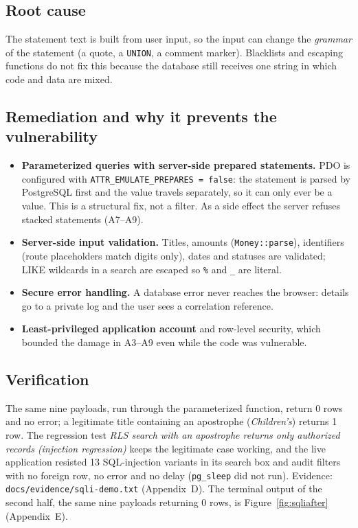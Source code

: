 \documentclass[10pt,a4paper]{article}
\newcommand{\code}[1]{\nolinkurl{#1}}
\begin{document}
\subsection{Root cause}
The statement text is built from user input, so the input can change the \emph{grammar} of the statement (a quote, a \code{UNION}, a comment marker). Blacklists and escaping functions do not fix this because the database still receives one string in which code and data are mixed.

\subsection{Remediation and why it prevents the vulnerability}
\begin{itemize}
\item \textbf{Parameterized queries with server-side prepared statements.} PDO is configured with \code{ATTR\_EMULATE\_PREPARES = false}: the statement is parsed by PostgreSQL first and the value travels separately, so it can only ever be a value. This is a structural fix, not a filter. As a side effect the server refuses stacked statements (A7--A9).
\item \textbf{Server-side input validation.} Titles, amounts (\code{Money::parse}), identifiers (route placeholders match digits only), dates and statuses are validated; LIKE wildcards in a search are escaped so \code{\%} and \code{\_} are literal.
\item \textbf{Secure error handling.} A database error never reaches the browser: details go to a private log and the user sees a correlation reference.
\item \textbf{Least-privileged application account} and row-level security, which bounded the damage in A3--A9 even while the code was vulnerable.
\end{itemize}

\subsection{Verification}
The same nine payloads, run through the parameterized function, return 0 rows and no error; a legitimate title containing an apostrophe (\emph{Children's}) returns 1 row. The regression test \emph{RLS search with an apostrophe returns only authorized records (injection regression)} keeps the legitimate case working, and the live application resisted 13 SQL-injection variants in its search box and audit filters with no foreign row, no error and no delay (\code{pg\_sleep} did not run). Evidence: \code{docs/evidence/sqli-demo.txt} (Appendix~D). The terminal output of the second half, the same nine payloads returning 0 rows, is Figure~\ref{fig:sqliafter} (Appendix~E).
\end{document}
